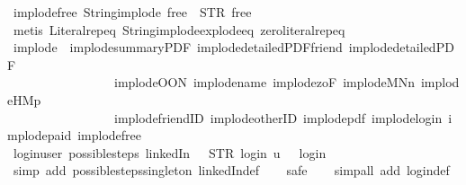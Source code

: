 \begin{isabellebody}
\isamarkupfalse%
\ implode{\isacharunderscore}free{\isacharcolon}\ {\isachardoublequoteopen}String{\isachardot}implode\ {\isacharprime}{\isacharprime}free{\isacharprime}{\isacharprime}\ {\isacharequal}\ STR\ {\isacharprime}{\isacharprime}free{\isacharprime}{\isacharprime}{\isachardoublequoteclose}\isanewline
%
\isadelimproof
\ \ %
\endisadelimproof
%
\isatagproof
{}\isamarkupfalse%
\ {\isacharparenleft}metis\ Literal{\isachardot}rep{\isacharunderscore}eq\ String{\isachardot}implode{\isacharunderscore}explode{\isacharunderscore}eq\ zero{\isacharunderscore}literal{\isachardot}rep{\isacharunderscore}eq{\isacharparenright}%
\endisatagproof
{\isafoldproof}%
%
\isadelimproof
\isanewline
%
\endisadelimproof
\isanewline
{}\isamarkupfalse%
\ implode\ {\isacharequal}\ implode{\isacharunderscore}summaryPDF\ implode{\isacharunderscore}detailedPDF{\isacharunderscore}friend\ implode{\isacharunderscore}detailedPDF\isanewline
\ \ \ \ \ \ \ \ \ \ \ \ \ \ \ \ \ implode{\isacharunderscore}OON\ implode{\isacharunderscore}name\ implode{\isacharunderscore}{}zoF\ implode{\isacharunderscore}MNn{}\ implode{\isacharunderscore}HM{}p\isanewline
\ \ \ \ \ \ \ \ \ \ \ \ \ \ \ \ \ implode{\isacharunderscore}friendID\ implode{\isacharunderscore}otherID\ implode{\isacharunderscore}pdf\ implode{\isacharunderscore}login\ implode{\isacharunderscore}paid\ implode{\isacharunderscore}free\isanewline
\isanewline
{}\isamarkupfalse%
\ login{\isacharunderscore}user{\isacharcolon}\ {\isachardoublequoteopen}possible{\isacharunderscore}steps\ linkedIn\ {}\ {\isacharless}{\isachargreater}\ STR\ {\isacharprime}{\isacharprime}login{\isacharprime}{\isacharprime}\ {\isacharbrackleft}u{\isacharbrackright}\ {\isacharequal}\ {\isacharbraceleft}{\isacharbar}{\isacharparenleft}{}{\isacharcomma}\ login{\isacharparenright}{\isacharbar}{\isacharbraceright}{\isachardoublequoteclose}\isanewline
%
\isadelimproof
\ \ %
\endisadelimproof
%
\isatagproof
{}\isamarkupfalse%
\ {\isacharparenleft}simp\ add{\isacharcolon}\ possible{\isacharunderscore}steps{\isacharunderscore}singleton\ linkedIn{\isacharunderscore}def{\isacharparenright}\isanewline
\ \ \isamarkupfalse%
\ safe\isanewline
\ \ \isamarkupfalse%
\ {\isacharparenleft}simp{\isacharunderscore}all\ add{\isacharcolon}\ login{\isacharunderscore}def{\isacharparenright}%
\endisatagproof
{\isafoldproof}%
%
\isadelimproof
\isanewline
%
\endisadelimproof
\isanewline
{}\isamarkupfalse%

\end{isabellebody}

